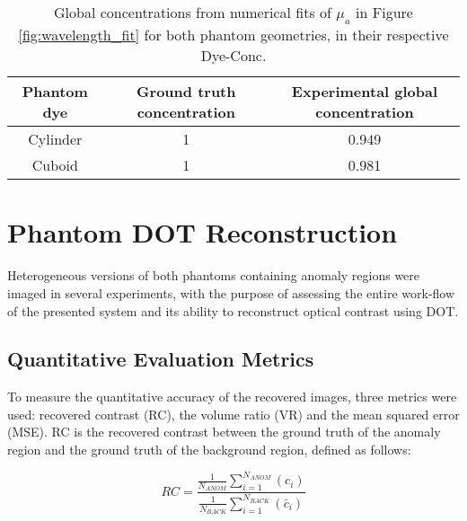 \documentclass[twoside]{bhamthesis}
\theoremstyle{definition}
\begin{document}
\bgroup
\def\arraystretch{1.2}
\begin{table}[!ht]
\small
\begin{center}
 \begin{tabular}{c c c} 
 \hline
 Phantom dye & Ground truth concentration & Experimental global concentration \\  
 \hline
 Cylinder & 1 & 0.949 \\
 Cuboid & 1 &  0.981 \\
 \hline
\end{tabular}
\caption{Global concentrations from numerical fits of $\mu_a$ in Figure \ref{fig:wavelength_fit} for both phantom geometries, in their respective Dye-Conc.}
\label{tab:PhantomOpticalPropertiesTable}
\end{center}
\end{table}
\egroup



\section{Phantom DOT Reconstruction}

Heterogeneous versions of both phantoms containing anomaly regions were imaged in several experiments, with the purpose of assessing the entire work-flow of the presented system and its ability to reconstruct optical contrast using DOT.

\subsection{Quantitative Evaluation Metrics}

\label{Evaluation Metrics}

To measure the quantitative accuracy of the recovered images, three metrics were used: recovered contrast (RC), the volume ratio (VR) and the mean squared error (MSE). RC is the recovered contrast between the ground truth of the anomaly region and the ground truth of the background region, defined as follows:

\begin{equation}
\label{eq:Recovered contrast}
RC= \frac{\frac{1}{N_{ANOM}}\sum_{i=1}^{N_{ANOM}}\left(c_i\right)}{\frac{1}{N_{BACK}}\sum_{i=1}^{N_{BACK}}\left(\bar{c}_i\right)}
\end{equation}
\end{document}
